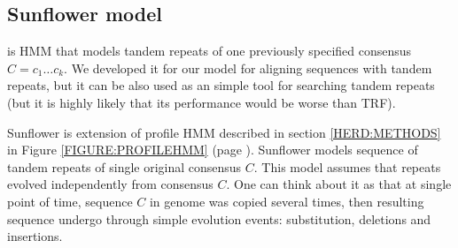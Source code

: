 \subsection{Sunflower model}
 is HMM that models tandem repeats of one
previously specified consensus $C=c_1\dots c_k$. We developed it for our model
for aligning sequences with tandem repeats, but it can be also used as an
simple tool for searching tandem repeats (but it is highly likely that its
performance would be worse than TRF).

Sunflower is extension of profile HMM described in section \ref{HERD:METHODS}
in Figure \ref{FIGURE:PROFILEHMM} (page \pageref{FIGURE:PROFILEHMM}). Sunflower
models sequence of tandem repeats of single original consensus $C$. This model
assumes that repeats evolved independently from consensus $C$. One can think
about it as that at single point of time, sequence $C$ in genome was copied
several times, then resulting sequence undergo through simple evolution events:
substitution, deletions and insertions.

